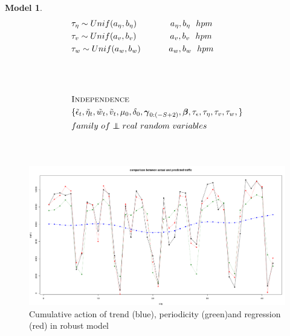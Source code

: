 \documentclass[11pt,twoside]{report}
\newcommand\independent{\protect\mathpalette{\protect\independenT}{\perp}}
\def\independenT#1#2{\mathrel{\rlap{$#1#2$}\mkern2mu{#1#2}}}
\newtheorem{model}{Model}
\begin{document}
\begin{model}
\begin{equation*}
\begin{aligned}[c]
	&\tau_\eta \sim Unif(a_\eta, b_\eta)\quad\quad\quad \quad a_\eta, b_\eta\ \ hpm\\
	&\tau_v \sim Unif(a_v, b_v)\quad\quad\quad \quad a_v, b_v\ \ hpm\\
	&\tau_w\sim Unif(a_w, b_w)\quad\quad\quad\ a_w, b_w\ \ hpm\\
	&\\
	&\\
	&\\
	&\textsc{Independence}\\
	&\{\tilde{\epsilon}_t, \tilde{\eta}_t, \tilde{w}_t, \tilde{v}_t, \mu_0, \delta_0, \boldsymbol{\gamma}_{0:(-S+2)}, \boldsymbol{\beta}, \tau_\epsilon, \tau_\eta, \tau_v, \tau_w, \}\\ &family\ of \independent real\ random\ variables\\
	&\\
	&\\
	\end{aligned}
	\end{equation*}
\end{model}

\begin{figure}[H]
	\centering
	\includegraphics[width=150 mm]{pictures/m5_p1.png}
	\caption{Cumulative action of trend (blue), periodicity (green)and regression (red) in robust model}
	\label{fig:M5_p1}
\end{figure}
\end{document}
